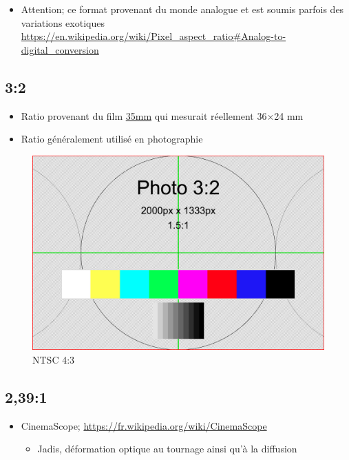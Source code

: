 \documentclass[
  french,
]{book}
\providecommand{\tightlist}{%
  \setlength{\itemsep}{0pt}\setlength{\parskip}{0pt}}
\begin{document}
\begin{itemize}
\tightlist
\item
  Attention; ce format provenant du monde analogue et est soumis parfois des variations exotiques
  \url{https://en.wikipedia.org/wiki/Pixel_aspect_ratio\#Analog-to-digital_conversion}
\end{itemize}

\hypertarget{section-3}{%
\subsection{3:2}\label{section-3}}

\begin{itemize}
\item
  Ratio provenant du film \href{https://en.wikipedia.org/wiki/35_mm_format}{35mm} qui mesurait réellement 36×24 mm
\item
  Ratio généralement utilisé en photographie
\end{itemize}

\begin{figure}
\centering
\includegraphics{medias/lexique/Photo_3_2_2000x1333.png}
\caption{NTSC 4:3}
\end{figure}

\hypertarget{section-4}{%
\subsection{2,39:1}\label{section-4}}

\begin{itemize}
\tightlist
\item
  CinemaScope; \url{https://fr.wikipedia.org/wiki/CinemaScope}

  \begin{itemize}
  \tightlist
  \item
    Jadis, déformation optique au tournage ainsi qu'à la diffusion
  \end{itemize}
\end{itemize}
\end{document}
